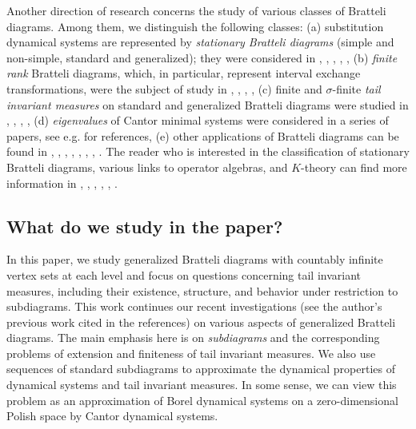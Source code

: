 \documentclass[11pt,reqno]{amsart}
\theoremstyle{definition}
\theoremstyle{remark}
\theoremstyle{plain}
\numberwithin{equation}{section}
\begin{document}
Another direction of research concerns the study of various classes of Bratteli diagrams. Among them, we distinguish the following classes: (a) substitution dynamical systems are represented by \textit{stationary Bratteli diagrams} (simple and non-simple, standard and generalized); they were considered in \cite{Forrest1997}, \cite{Durand_Host_skau_1999}, \cite{BezuglyiKwiatkowskiMedynetsSolomyak2010}, \cite{Bezuglyi_Jorgensen_Sanadhya_2023}, \cite{BezuglyiJorgensenKarpelSanadhya2025}, (b) \textit{finite rank}  Bratteli diagrams, which, in particular, represent interval exchange transformations, were the subject of study in  \cite{Downarowicz_Maass_2008}, \cite{BressaudDurandMaass2010}, \cite{DonosoDurandMaassPetite_2021}, \cite{BezuglyiKwiatkowskiYassawi2014}, (c) finite and $\sigma$-finite \textit{tail invariant measures} on standard and generalized Bratteli diagrams were studied in \cite{AdamskaBezuglyiKarpelKwiatkowski2017},  
 \cite{BezuglyiKarpelKwiatkowski2019}, \cite{BezuglyiKarpel_2020},
 \cite{BezuglyiJorgensenKarpelSanadhya2025}, (d) \textit{eigenvalues} of Cantor minimal systems were considered  in a series of papers, see e.g. 
\cite{DurandFrankMaass_2019} for references, (e) other applications of Bratteli diagrams can be found in  \cite{AminiElliottGolestani2021},
\cite{DurandPerrin2022}, 
\cite{GiordanoGoncalvesStarling2017},
\cite{GiordanoMatuiPutnamSkau2010}, \cite{DownarowiczMaass2008}, 
\cite{GjerdeJohansen2000}, 
\cite{Putnam2018},  \cite{Trevinio2018}.  
The reader who is interested in the classification of stationary Bratteli diagrams, various links to operator algebras, and $K$-theory can find more information in 
\cite{Bratteli1972}, \cite{Effros1981}, 
\cite{EffrosHandelmanShen1980}, 
\cite{BratteliJorgensenKimRoush2000},
\cite{BratteliJorgensenKimRoush2001},
\cite{BratteliJorgensenKimRoush2002}.

\subsection{What do we study in the paper?}
In this paper, we study generalized Bratteli diagrams with countably infinite vertex sets at each level and focus on questions concerning tail invariant measures, including their existence, structure, and behavior under restriction to subdiagrams. This work continues our recent investigations 
(see the author’s previous work cited in the references) on various aspects of generalized Bratteli diagrams. The main emphasis here is on \textit{subdiagrams} and the corresponding problems of extension and finiteness of tail invariant measures.
We also use sequences of standard subdiagrams to approximate the dynamical properties of dynamical systems and tail invariant measures. In some sense, we can view this problem as an approximation of Borel dynamical systems on a zero-dimensional Polish space by Cantor dynamical systems.
\end{document}
